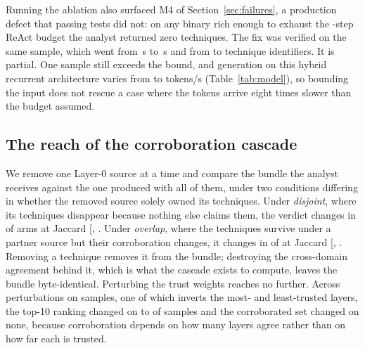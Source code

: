 Running the ablation also surfaced M4 of Section~\ref{sec:failures}, a production defect that
 passing tests did not: on any binary rich enough to exhaust the
-step ReAct budget the analyst returned zero techniques. The fix was verified on the same sample, which went from \,s to
\,s and from  to 
technique identifiers. It is partial. One sample still exceeds the bound, and generation on this hybrid recurrent
architecture varies from  to  tokens/s
(Table~\ref{tab:model}), so bounding the input does not rescue a case where the tokens arrive eight
times slower than the budget assumed.

\subsection{The reach of the corroboration cascade}\label{sec:cascade}

We remove one Layer-0 source at a time and compare the bundle the analyst receives against the one produced
with all of them, under two conditions differing in whether the removed source solely owned its
techniques. Under \emph{disjoint}, where its techniques disappear because nothing else
claims them, the verdict changes in  of 
arms at Jaccard  {[},
\fact{cascade-disjoint-jaccard-max}{]}. Under \emph{overlap}, where the techniques survive under a
partner source but their corroboration changes, it changes in  of
 at Jaccard 
{[}, \fact{cascade-overlap-jaccard-max}{]}. Removing a technique removes it from the bundle; destroying the cross-domain agreement behind it,
which is what the cascade exists to compute, leaves the bundle byte-identical. Perturbing the trust
weights reaches no further. Across  perturbations on
 samples, one of which inverts the most- and least-trusted layers, the
top-10 ranking changed on  to  of
samples and the corroborated set changed on none, because corroboration depends on how many layers
agree rather than on how far each is trusted.

